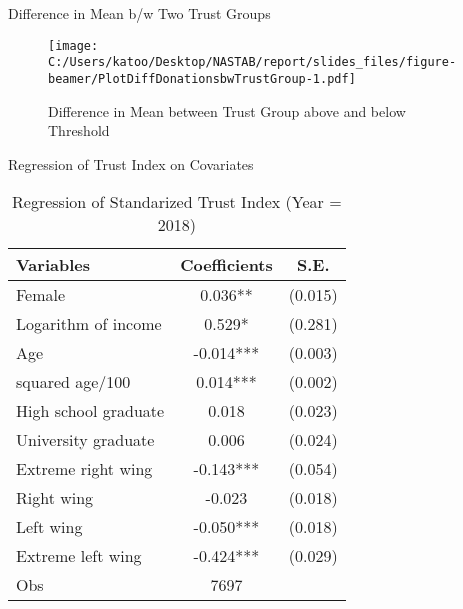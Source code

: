 \documentclass[
  ignorenonframetext,
]{beamer}
\begin{document}
\begin{frame}{Difference in Mean b/w Two Trust Groups}
\protect\hypertarget{difference-in-mean-bw-two-trust-groups}{}
\begin{figure}
\centering
\texttt{[image: C:/Users/katoo/Desktop/NASTAB/report/slides\_files/figure-beamer/PlotDiffDonationsbwTrustGroup-1.pdf]}
\caption{Difference in Mean between Trust Group above and below
Threshold}
\end{figure}
\end{frame}

\begin{frame}{Regression of Trust Index on Covariates}
\protect\hypertarget{regression-of-trust-index-on-covariates}{}
\begin{table}

\caption{\label{tab:kableRegTrustidOnCovariate}Regression of Standarized Trust Index (Year = 2018)}
\centering
\begin{tabular}[t]{lcc}
\toprule
Variables & Coefficients & S.E.\\
\midrule
Female & 0.036** & (0.015)\\
Logarithm of income & 0.529* & (0.281)\\
Age & -0.014*** & (0.003)\\
squared age/100 & 0.014*** & (0.002)\\
High school graduate & 0.018 & (0.023)\\
University graduate & 0.006 & (0.024)\\
Extreme right wing & -0.143*** & (0.054)\\
Right wing & -0.023 & (0.018)\\
Left wing & -0.050*** & (0.018)\\
Extreme left wing & -0.424*** & (0.029)\\
Obs & 7697 & \\
\bottomrule
\end{tabular}
\end{table}
\end{frame}
\end{document}
